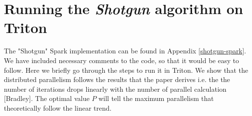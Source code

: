 \documentclass[a4paper,11pt]{article}
\begin{document}
\section{Running the \textit{Shotgun} algorithm on Triton}
The "Shotgun" Spark implementation can be found in Appendix \ref{shotgun-spark}. We have included necessary comments to the code, so that it would be easy to follow. Here we briefly go through the steps to run it in Triton. We show that the distributed parallelism follows the results that the paper derives i.e. the the number of iterations drops linearly with the number of parallel calculation [Bradley]. The optimal value $P$ will tell the maximum parallelism that theoretically follow the linear trend.
\end{document}
